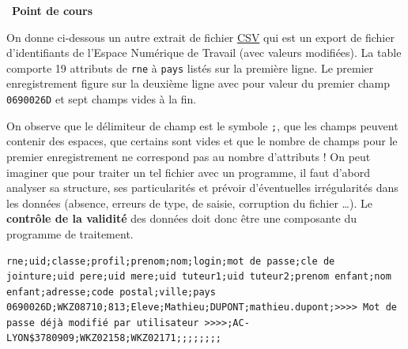 \documentclass[
  11pt,
]{article}
\newcommand{\passthrough}[1]{#1}
\newcounter{cours}
\newenvironment{cours}[1]
{\par \medskip   \addtocounter{cours}{1} \noindent  
\begin{bclogo}[arrondi =0.1,  ombre = true, barre=none, logo=\bcbook, marge=4]{~\textbf{Point de cours} \textbf{\thecours} {\itshape #1} }  \par}
{
\end{bclogo}
 \par \bigskip }
\newcounter{prog}
\newcounter{logi}
\begin{document}
\begin{cours}{}
On donne ci-dessous un autre extrait de fichier
\href{https://fr.wikipedia.org/wiki/Comma-separated_values}{CSV} qui est
un export de fichier d'identifiants de l'Espace Numérique de Travail
(avec valeurs modifiées). La table comporte 19 attributs de
\passthrough{\lstinline!rne!} à \passthrough{\lstinline!pays!} listés
sur la première ligne. Le premier enregistrement figure sur la deuxième
ligne avec pour valeur du premier champ
\passthrough{\lstinline!0690026D!} et sept champs vides à la fin.

On observe que le délimiteur de champ est le symbole
\passthrough{\lstinline!;!}, que les champs peuvent contenir des
espaces, que certains sont vides et que le nombre de champs pour le
premier enregistrement ne correspond pas au nombre d'attributs ! On peut
imaginer que pour traiter un tel fichier avec un programme, il faut
d'abord analyser sa structure, ses particularités et prévoir
d'éventuelles irrégularités dans les données (absence, erreurs de type,
de saisie, corruption du fichier \ldots). Le \textbf{contrôle de la
validité} des données doit donc être une composante du programme de
traitement.

\begin{lstlisting}
rne;uid;classe;profil;prenom;nom;login;mot de passe;cle de jointure;uid pere;uid mere;uid tuteur1;uid tuteur2;prenom enfant;nom enfant;adresse;code postal;ville;pays
0690026D;WKZ08710;813;Eleve;Mathieu;DUPONT;mathieu.dupont;>>>> Mot de passe déjà modifié par utilisateur >>>>;AC-LYON$3780909;WKZ02158;WKZ02171;;;;;;;;
\end{lstlisting}

\end{cours}
\end{document}
